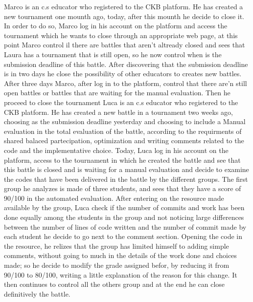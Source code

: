 \documentclass{article}
\newcounter{subsubsubsection}[subsubsection]
\begin{document}
{            
                Marco is an c.s educator who registered to the CKB platform. He has created a new tournament one mounth ago, today, after this mounth he decide to close it. In order to do so, Marco log in his account on the platform and access the tournament which he wants to close through an appropriate web page, at this point Marco control il there are battles that aren't altready closed and sees that Laura has a tournament that is still open, so he now control when is the submission deadline of this battle. After discovering that the submission deadline is in two days he close the possibility of other educators to creates new battles.
                After three days Marco, after log in to the platform, control that there are'n still open battles or battles that are waiting for the manual evaluation. Then he proceed to close the tournament
                Luca is an c.s educator who registered to the CKB platform. He has created a new battle in a tournament two weeks ago, choosing as the submission deadline yesterday and choosing to include a Manual evaluation in the total evaluation of the battle, according to the requirments of shared balaced partecipation, optimization and writing comments related to the code and the implementative choice.
                Today, Luca log in his account on the platform, access to the tournament in which he created the battle and see that this battle is closed and is waiting for a manual evaluation and decide to examine the codes that have been delivered in the battle by the different groups.
                The first group he analyzes is made of three students, and sees that they have a score of 90/100 in the automated evaluation. After entering on the resource made available by the group, Luca check if the number of commits and work has been done equally among the students in the group and not noticing large differences between the number of lines of code written and the number of commit made by each student he decide to go next to the comment section.
                Opening the code in the resource, he relizes that the group has limited himself to adding simple comments, without going to much in the details of the work done and choices made; so he decide to modify the grade assigned befor, by reducing it from 90/100 to 80/100, writing a little explanation of the reason for this change. It then continues to control all the others group and at the end he can close definitively the battle.
}
\end{document}
